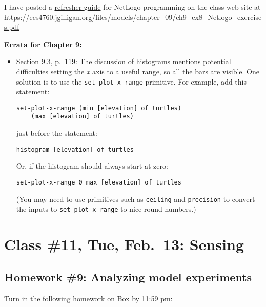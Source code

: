 \documentclass[]{article}
\begin{document}
I have posted a
\href{/files/models/chapter_09/ch9_ex8_Netlogo_exercises.pdf}{refresher
guide} for NetLogo programming on the class web site at
\url{https://ees4760.jgilligan.org/files/models/chapter_09/ch9_ex8_Netlogo_exercises.pdf}

\textbf{Errata for Chapter 9:}

\begin{itemize}
\item
  Section 9.3, p.~119: The discussion of histograms mentions potential
  difficulties setting the \emph{x} axis to a useful range, so all the
  bars are visible. One solution is to use the \texttt{set-plot-x-range}
  primitive. For example, add this statement:

\begin{verbatim}
set-plot-x-range (min [elevation] of turtles) 
    (max [elevation] of turtles)
\end{verbatim}

  just before the statement:

\begin{verbatim}
histogram [elevation] of turtles
\end{verbatim}

  Or, if the histogram should always start at zero:

\begin{verbatim}
set-plot-x-range 0 max [elevation] of turtles
\end{verbatim}

  (You may need to use primitives such as \texttt{ceiling} and
  \texttt{precision} to convert the inputs to \texttt{set-plot-x-range}
  to nice round numbers.)
\end{itemize}

\hypertarget{class-11-tue-feb.13-sensing}{%
\section{Class \#11, Tue, Feb.~13:
Sensing}\label{class-11-tue-feb.13-sensing}}

\hypertarget{homework-9-analyzing-model-experiments}{%
\subsection{Homework \#9: Analyzing model
experiments}\label{homework-9-analyzing-model-experiments}}

Turn in the following homework on Box by 11:59 pm:
\end{document}
